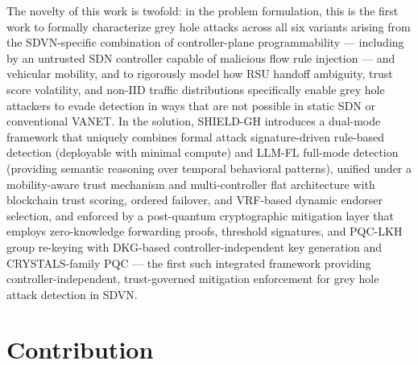 \documentclass[12pt, a4paper]{report}
\newcommand{\mypar}{\vspace{0.8em}\noindent}
\begin{document}
The novelty of this work is twofold: in the problem formulation, this is the
first work to formally characterize grey hole attacks across all six variants
arising from the SDVN-specific combination of controller-plane programmability
— including by an untrusted SDN controller capable of malicious flow rule
injection — and vehicular mobility, and to rigorously model how RSU handoff
ambiguity, trust score volatility, and non-IID traffic distributions specifically
enable grey hole attackers to evade detection in ways that are not possible in
static SDN or conventional VANET. In the solution, SHIELD-GH introduces a
dual-mode framework that uniquely combines formal attack signature-driven
rule-based detection (deployable with minimal compute) and LLM-FL full-mode
detection (providing semantic reasoning over temporal behavioral patterns),
unified under a mobility-aware trust mechanism and
multi-controller flat architecture with blockchain trust
scoring, ordered failover, and VRF-based dynamic endorser
selection, and enforced by a post-quantum cryptographic
mitigation layer that employs zero-knowledge forwarding
proofs, threshold signatures, and PQC-LKH group re-keying
with DKG-based controller-independent key generation and
CRYSTALS-family PQC — the first such integrated framework
providing controller-independent, trust-governed mitigation
enforcement for grey hole attack detection in SDVN.



\mypar
\section{Contribution}
\end{document}
